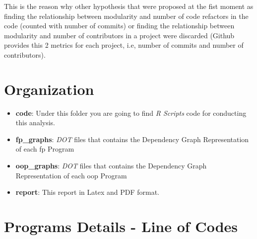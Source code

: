 \documentclass[12pt, a4paper]{article}
\begin{document}
This is the reason why other hypothesis that were proposed at the fist moment as finding the relationship between modularity and number of code refactors in the code (counted with number of commits) or finding the relationship between modularity and number of contributors in a project were discarded (Github provides this 2 metrics for each project, i.e, number of commits and number of contributors).
\newpage










\appendix
\section{Organization}\label{apx:sec:org:1}

\begin{itemize}
    \item \textbf{code}: Under this folder you are going to find \textit{R Scripts} code for conducting this analysis.
    \item \textbf{fp\_graphs}: \textit{DOT} files that contains the Dependency Graph Representation of each \acrlong{fp} Program
    \item \textbf{oop\_graphs}: \textit{DOT} files that contains the Dependency Graph Representation of each \acrlong{oop} Program
    \item \textbf{report}: This report in Latex and PDF format.
\end{itemize}

\section{Programs Details - Line of Codes}\label{apx:sec:loc}
\end{document}
